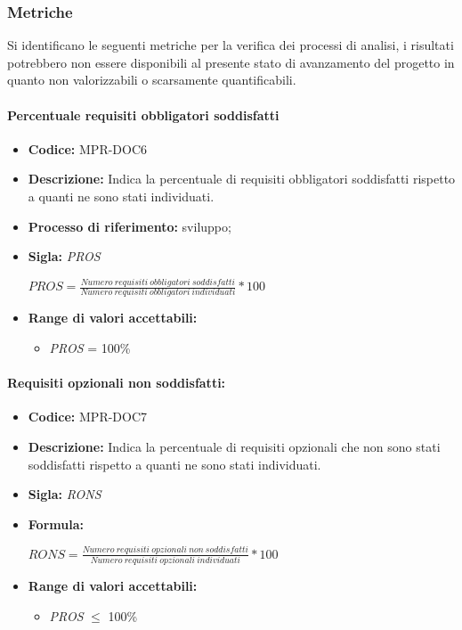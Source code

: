 \subsubsection{Metriche}

Si identificano le seguenti metriche per la verifica dei processi di analisi, i risultati potrebbero non essere disponibili al presente stato di avanzamento del progetto
in quanto non valorizzabili o scarsamente quantificabili.


\paragraph{Percentuale requisiti obbligatori soddisfatti}
    
 \begin{itemize}
    \item \textbf{Codice:} MPR-DOC6
    \item \textbf{Descrizione:} Indica la percentuale di requisiti obbligatori soddisfatti rispetto a quanti ne sono stati individuati.
    \item \textbf{Processo di riferimento:} sviluppo;
    \item \textbf{Sigla:} \textit{PROS}
  
    
    \begin{center}
        \(PROS = \frac{Numero\ requisiti\ obbligatori\ soddisfatti}{Numero\ requisiti\  obbligatori\ individuati}*100\)
    \end{center}

    \item \textbf{Range di valori accettabili:}
    \begin{itemize}
        \item  \textit{PROS} = 100\%
    \end{itemize}
\end{itemize}
    
  
\paragraph{Requisiti opzionali non soddisfatti:}
  \begin{itemize}
    \item \textbf{Codice:} MPR-DOC7
    \item \textbf{Descrizione:} Indica la percentuale di requisiti opzionali che non sono stati soddisfatti rispetto a quanti ne sono stati individuati.
    \item \textbf{Sigla:} \textit{RONS}
    \item \textbf{Formula:}
    \begin{center}
        \(RONS=\frac{Numero\ requisiti\ opzionali\ non\ soddisfatti}{Numero\ requisiti\  opzionali\ individuati}*100\)
    \end{center}
    \item \textbf{Range di valori accettabili:}
    \begin{itemize}
        \item \textit{PROS} $\leq$ 100\%
    
    \end{itemize}
\end{itemize}


